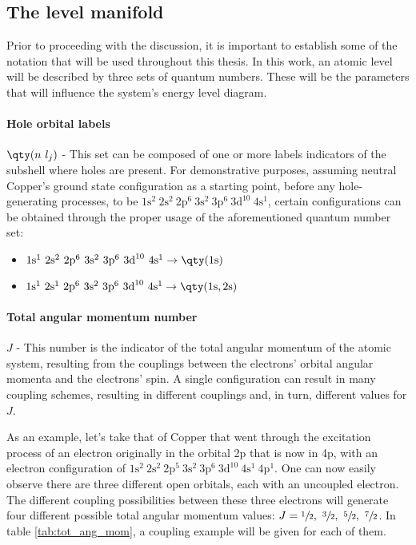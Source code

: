 \subsection{The level manifold}




Prior to proceeding with the discussion, it is important to establish some of the notation that will be used throughout this thesis. In this work, an atomic level will be described by three sets of quantum numbers. These will be the parameters that will influence the system's energy level diagram.

\paragraph{Hole orbital labels}


$\qty(n\ l_j)$ - This set can be composed of one or more labels indicators of the subshell where holes are present.
For demonstrative purposes, assuming neutral Copper's ground state configuration as a starting point, before any hole-generating processes, to be $1\text{s}^2\ 2\text{s}^2\ 2\text{p}^6\ 3\text{s}^2\ 3\text{p}^6\ 3\text{d}^{10}\ 4\text{s}^1$, certain configurations can be obtained through the proper usage of the aforementioned quantum number set:

\begin{itemize}
    \item $1\text{s}^1\ 2\text{s}^2\ 2\text{p}^6\ 3\text{s}^2\ 3\text{p}^6\ 3\text{d}^{10}\ 4\text{s}^1  \rightarrow \qty(1\text{s})$
    \item $1\text{s}^1\ 2\text{s}^1\ 2\text{p}^6\ 3\text{s}^2\ 3\text{p}^6\ 3\text{d}^{10}\ 4\text{s}^1 \rightarrow \qty(1\text{s},2\text{s})$
\end{itemize}




\paragraph{Total angular momentum number}


$J$ - This number is the indicator of the total angular momentum of the atomic system, resulting from the couplings between the electrons'  orbital angular momenta and the electrons' spin. A single configuration can result in many coupling schemes, resulting in different couplings and, in turn, different values for $J$.

As an example, let's take that of Copper that went through the excitation process of an electron originally in the orbital 2p that is now in 4p, with an electron configuration of $1\text{s}^2\ 2\text{s}^2\ 2\text{p}^5\ 3\text{s}^2\ 3\text{p}^6\ 3\text{d}^{10}\ 4\text{s}^1\  4\text{p}^1 $. One can now easily observe there are three different open orbitals, each with an uncoupled electron. The different coupling possibilities between these three electrons will generate four different possible total angular momentum values: $J=\sfrac{1}{2},\ \sfrac{3}{2},\ \sfrac{5}{2},\ \sfrac{7}{2}$. In table \ref{tab:tot_ang_mom}, a coupling example will be given for each of them.


